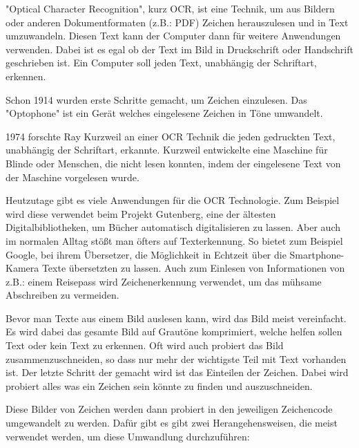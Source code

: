 \label{sec:ocr}


"Optical Character Recognition", kurz OCR, ist eine Technik, um aus Bildern oder anderen Dokumentformaten (z.B.: PDF) Zeichen herauszulesen und in Text umzuwandeln. Diesen Text kann der Computer dann für weitere Anwendungen verwenden. Dabei ist es egal ob der Text im Bild in Druckschrift oder Handschrift geschrieben ist. Ein Computer soll jeden Text, unabhängig der Schriftart, erkennen.
\cite{OCRIntro}


Schon 1914 wurden erste Schritte gemacht, um Zeichen einzulesen. Das "Optophone" ist ein Gerät welches eingelesene Zeichen in Töne umwandelt.

1974 forschte Ray Kurzweil an einer OCR Technik die jeden gedruckten Text, unabhängig der Schriftart, erkannte. Kurzweil entwickelte eine Maschine für Blinde oder Menschen, die nicht lesen konnten, indem der eingelesene Text von der Maschine vorgelesen wurde.

Heutzutage gibt es viele Anwendungen für die OCR Technologie. Zum Beispiel wird diese verwendet beim Projekt Gutenberg, eine der ältesten Digitalbibliotheken, um Bücher automatisch digitalisieren zu lassen. Aber auch im normalen Alltag stößt man öfters auf Texterkennung. So bietet zum Beispiel Google, bei ihrem Übersetzer, die Möglichkeit in Echtzeit über die Smartphone-Kamera Texte übersetzten zu lassen. Auch zum Einlesen von Informationen von z.B.: einem Reisepass wird Zeichenerkennung verwendet, um das mühsame Abschreiben zu vermeiden.\cite{OCRRecognition}


Bevor man Texte aus einem Bild auslesen kann, wird das Bild meist vereinfacht. Es wird dabei das gesamte Bild auf Grautöne komprimiert, welche helfen sollen Text oder kein Text zu erkennen. Oft wird auch probiert das Bild zusammenzuschneiden, so dass nur mehr der wichtigste Teil mit Text vorhanden ist. Der letzte Schritt der gemacht wird ist das Einteilen der Zeichen. Dabei wird probiert alles was ein Zeichen sein könnte zu finden und auszuschneiden.\cite{OCRPreProcessing}

Diese Bilder von Zeichen werden dann probiert in den jeweiligen Zeichencode umgewandelt zu werden. Dafür gibt es gibt zwei Herangehensweisen, die meist verwendet werden, um diese Umwandlung durchzuführen:


